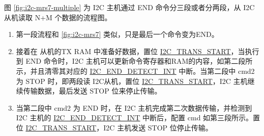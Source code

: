\documentclass[main\_\_CN.tex]{subfiles}
\begin{document}
图 \ref{fig:i2c-mrs7-multiple} 为 I2C 主机通过 END 命令分三段或者分两段，从 I2C 从机读取 N+M 个数据的流程图。
\begin{enumerate}
    \item 第一段流程和 \ref{fig:i2c-mrs7} 类似，只是最后一个命令变为END。
    \item 接着在 从机的TX RAM 中准备好数据，置位 \hyperref[fielddesc:I2CTRANSSTART]{I2C\_TRANS\_START}，当执行到 END 命令时，I2C 主机可以更新命令寄存器和RAM的内容，如第二段所示，并且清零其对应的 \hyperref[int:i2c-end]{I2C\_END\_DETECT\_INT} 中断。当第二段中 cmd2 为 STOP 时，即两段读 I2C从机，置位 \hyperref[fielddesc:I2CTRANSSTART]{I2C\_TRANS\_START}，I2C 主机继续传输数据，最后发送 STOP 位来停止传输。
    \item 当第二段中 cmd2 为 END 时，在 I2C 主机完成第二次数据传输，并检测到 I2C 主机的 \hyperref[int:i2c-end]{I2C\_END\_DETECT\_INT} 中断后，配置 cmd 如第三段所示。置位 \hyperref[fielddesc:I2CTRANSSTART]{I2C\_TRANS\_START}，I2C 主机发送 STOP 位停止传输。
\end{enumerate}
\end{document}
